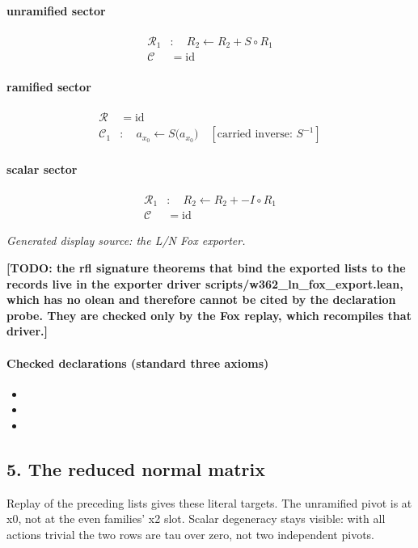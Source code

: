 \paragraph{unramified sector}
\[\begin{aligned}\mathcal R_{1}&:\quad R_2\leftarrow R_2+S\circ R_1\\\mathcal C&=\mathrm{id}\end{aligned}\]
\paragraph{ramified sector}
\[\begin{aligned}\mathcal R&=\mathrm{id}\\\mathcal C_{1}&:\quad a_{x_{0}}\leftarrow S\bigl(a_{x_{0}}\bigr)\quad[\text{carried inverse: }S^{-1}]\end{aligned}\]
\paragraph{scalar sector}
\[\begin{aligned}\mathcal R_{1}&:\quad R_2\leftarrow R_2+-I\circ R_1\\\mathcal C&=\mathrm{id}\end{aligned}\]
\par\noindent\emph{Generated display source: the L/N Fox exporter.}
\par\noindent\textbf{[TODO: the rfl signature theorems that bind the exported lists to the records live in the exporter driver scripts/w362\_ln\_fox\_export.lean, which has no olean and therefore cannot be cited by the declaration probe. They are checked only by the Fox replay, which recompiles that driver.]}
\paragraph{Checked declarations (standard three axioms)}
\begin{itemize}
\item {}
\item {}
\item {}
\end{itemize}

\subsection*{5. The reduced normal matrix}
Replay of the preceding lists gives these literal targets. The unramified pivot is at x0, not at the even families' x2 slot. Scalar degeneracy stays visible: with all actions trivial the two rows are tau over zero, not two independent pivots.

